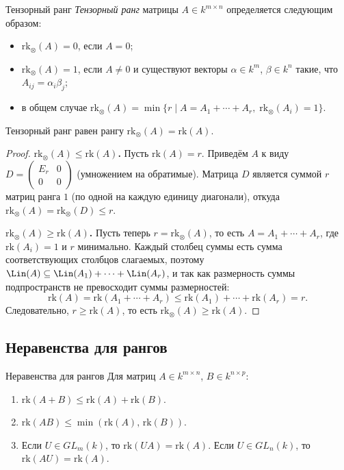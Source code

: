 \begin{Definition}{Тензорный ранг}{}
    \emph{Тензорный ранг} матрицы $A \in k^{m \times n}$ определяется следующим образом:
    \begin{itemize}
        \item $\mathrm{rk}_{\otimes}(A) = 0$, если $A = 0$;
        \item $\mathrm{rk}_{\otimes}(A) = 1$, если $A \neq 0$ и существуют векторы
              $\alpha \in k^m$, $\beta \in k^n$ такие, что $A_{ij} = \alpha_i \beta_j$;
        \item в общем случае $\mathrm{rk}_{\otimes}(A) = \min\bigl\{r \mid A = A_1 + \cdots + A_r,\;
              \mathrm{rk}_{\otimes}(A_i) = 1\bigr\}$.
    \end{itemize}
\end{Definition}
\begin{Theorem}{Тензорный ранг равен рангу}{}
    $\mathrm{rk}_{\otimes}(A) = \mathrm{rk}(A)$.
\end{Theorem}

\begin{proof}
\textbf{$\mathrm{rk}_{\otimes}(A) \leq \mathrm{rk}(A)$.} Пусть $\mathrm{rk}(A) = r$. Приведём $A$ к виду $D = \begin{pmatrix} E_r & 0 \\ 0 & 0 \end{pmatrix}$ (умножением на обратимые). Матрица $D$ является суммой $r$ матриц ранга $1$ (по одной на каждую единицу диагонали), откуда $\mathrm{rk}_{\otimes}(A) = \mathrm{rk}_{\otimes}(D) \leq r$.

\textbf{$\mathrm{rk}_{\otimes}(A) \geq \mathrm{rk}(A)$.} Пусть теперь $r = \mathrm{rk}_{\otimes}(A)$, то есть $A = A_1 + \cdots + A_r$, где $\mathrm{rk}(A_i) = 1$ и $r$ минимально. Каждый столбец суммы есть сумма соответствующих столбцов слагаемых, поэтому $\Lin(A) \subseteq \Lin(A_1) + \cdots + \Lin(A_r)$, и так как размерность суммы подпространств не превосходит суммы размерностей:
\[
    \mathrm{rk}(A) = \mathrm{rk}(A_1 + \cdots + A_r) \leq \mathrm{rk}(A_1) + \cdots + \mathrm{rk}(A_r) = r.
\]
Следовательно, $r \geq \mathrm{rk}(A)$, то есть $\mathrm{rk}_{\otimes}(A) \geq \mathrm{rk}(A)$.
\end{proof}

\subsection{Неравенства для рангов}

\begin{Theorem}{Неравенства для рангов}{}
    Для матриц $A \in k^{m \times n}$, $B \in k^{n \times p}$:
    \begin{enumerate}
        \item $\mathrm{rk}(A + B) \leq \mathrm{rk}(A) + \mathrm{rk}(B)$.
        \item $\mathrm{rk}(AB) \leq \min(\mathrm{rk}(A),\, \mathrm{rk}(B))$.
        \item Если $U \in GL_m(k)$, то $\mathrm{rk}(UA) = \mathrm{rk}(A)$. Если $U \in GL_n(k)$, то $\mathrm{rk}(AU) = \mathrm{rk}(A)$.
    \end{enumerate}
\end{Theorem}

